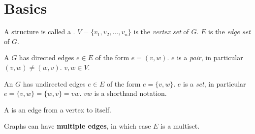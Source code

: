 
\section{Basics}

\begin{definition}
A structure  is called a .
$V=\{v_1, v_2, \ldots, v_n\}$ is the \emph{vertex set} of $G$. $E$ is the
\emph{edge set} of $G$.
\end{definition}

\begin{definition}
A  $G$ has directed edges $e\in E$ of the form
$e=(v,w)$. $e$ is a \emph{pair}, in particular $(v,w)\ne (w,v)$. $v,w\in V$.
\end{definition}

\begin{definition}
An  $G$ has undirected edges $e\in E$ of the form
$e=\{v,w\}$. $e$ is a \emph{set}, in particular $e=\{v,w\}=\{w,v\}=vw$. $vw$ is a
shorthand notation.
\end{definition}

A  is an edge from a vertex to itself.

Graphs can have \textbf{multiple edges}, in which case $E$ is a multiset.

